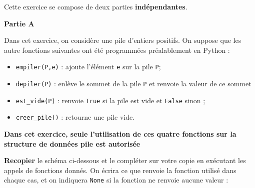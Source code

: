 \documentclass[11pt,a4paper]{article}
\begin{document}
\separateur


Cette exercice se compose de deux parties \textbf{indépendantes}.

\vspace{0.2cm}
\large{\bf  Partie A}

Dans cet exercice, on considère une pile d'entiers positifs. On suppose que les autre fonctions suivantes ont été programmées préalablement en Python :
\begin{itemize}
    \item {\tt empiler(P,e)} : ajoute l'élément {\tt e} sur la pile {\tt P};
    \item {\tt depiler(P)} : enlève le sommet de la pile {\tt P} et renvoie la valeur de ce sommet
    \item {\tt est\_vide(P)} : renvoie {\tt True} si la pile est vide et {\tt False} sinon ;
    \item {\tt creer\_pile()} : retourne une pile vide.
\end{itemize}

\textbf{Dans cet exercice, seule l'utilisation de ces quatre fonctions sur la structure de données pile est autorisée}

\QListe
\item \textbf{Recopier} le schéma ci-dessous et le compléter sur votre copie en exécutant les appels de fonctions donnés. On écrira ce que renvoie la fonction utilisé dans chaque cas, et on indiquera {\tt None} si la fonction ne renvoie aucune valeur :
\end{document}
